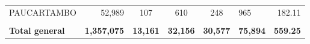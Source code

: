 \begin{tabular}{lrccclr}
	\cellcolor[HTML]{C6E0B4}PAUCARTAMBO                            & 52,989                                                         & 107                                                         & 610                  & 248                      & 965                                                                 & 182.11                                                                       \\
	& \multicolumn{1}{l}{}                                           & \multicolumn{1}{l}{}                                        & \multicolumn{1}{l}{} & \multicolumn{1}{l}{}     &                                                                     & \multicolumn{1}{l}{}                                                         \\
	\rowcolor[HTML]{DDEBF7} 
	\textbf{Total   general}                                       & \textbf{1,357,075}                                             & \multicolumn{1}{r}{\cellcolor[HTML]{DDEBF7}\textbf{13,161}} & \textbf{32,156}      & \textbf{30,577}          & \textbf{75,894}                                                     & \textbf{559.25}                                                             
\end{tabular}